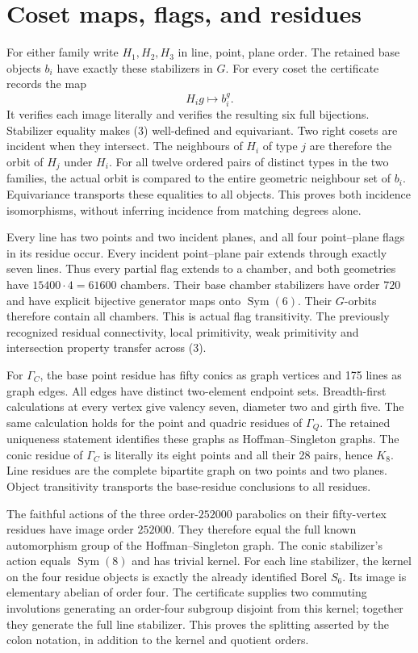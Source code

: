 \documentclass[11pt]{article}
\newcommand{\Sym}{\operatorname{Sym}}
\begin{document}
\section*{Coset maps, flags, and residues}
For either family write $H_1,H_2,H_3$ in line, point, plane order.
The retained base objects $b_i$ have exactly these stabilizers in $G$.
For every coset the certificate records the map
\[
             H_i g\longmapsto b_i^g.                       \tag{3}
\]
It verifies each image literally and verifies the resulting six full
bijections.  Stabilizer equality makes (3) well-defined and equivariant.
Two right cosets are incident when they intersect.  The neighbours of
$H_i$ of type $j$ are therefore the orbit of $H_j$ under $H_i$.
For all twelve ordered pairs of distinct types in the two families,
the actual orbit is compared to the entire geometric neighbour set of
$b_i$.  Equivariance transports these equalities to all objects.  This
proves both incidence isomorphisms, without inferring incidence from
matching degrees alone.

Every line has two points and two incident planes, and all four
point--plane flags in its residue occur.  Every incident point--plane
pair extends through exactly seven lines.  Thus every partial flag
extends to a chamber, and both geometries have $15400\cdot4=61600$
chambers.  Their base chamber stabilizers have order $720$ and have
explicit bijective generator maps onto $\Sym(6)$.  Their $G$-orbits
therefore contain all chambers.  This is actual flag transitivity.
The previously recognized residual connectivity, local primitivity,
weak primitivity and intersection property transfer across (3).

For $\Gamma_C$, the base point residue has fifty conics as graph
vertices and 175 lines as graph edges.  All edges have distinct
two-element endpoint sets.  Breadth-first calculations at every vertex
give valency seven, diameter two and girth five.  The same calculation
holds for the point and quadric residues of $\Gamma_Q$.  The retained
uniqueness statement identifies these graphs as Hoffman--Singleton
graphs.  The conic residue of $\Gamma_C$ is literally its eight points
and all their 28 pairs, hence $K_8$.  Line residues are the complete
bipartite graph on two points and two planes.  Object transitivity
transports the base-residue conclusions to all residues.

The faithful actions of the three order-$252000$ parabolics on their
fifty-vertex residues have image order $252000$.  They therefore equal
the full known automorphism group of the Hoffman--Singleton graph.
The conic stabilizer's action equals $\Sym(8)$ and has trivial kernel.
For each line stabilizer, the kernel on the four residue objects is
exactly the already identified Borel $S_6$.  Its image is elementary
abelian of order four.  The certificate supplies two commuting
involutions generating an order-four subgroup disjoint from this kernel;
together they generate the full line stabilizer.  This proves the
splitting asserted by the colon notation, in addition to the kernel
and quotient orders.
\end{document}
